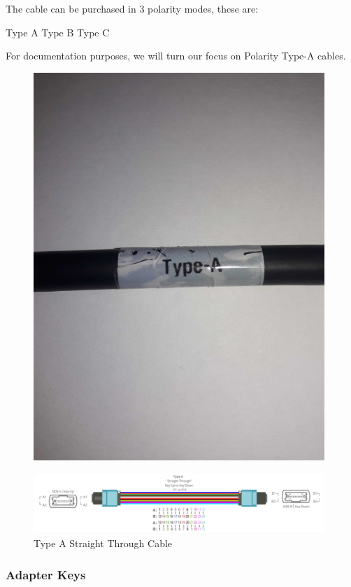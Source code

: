   The cable can be purchased in 3 polarity modes, these are:

      Type A
      Type B
      Type C

  For documentation purposes, we will turn our focus on Polarity Type-A cables.

\begin{figure}
  \includegraphics[width=11cm]{images/66.jpg}
  \centering
  \label{fig:jlsimon}
\end{figure}

\begin{figure}
  \includegraphics[width=11cm]{images/7.png}
  \centering
  \caption{Type A Straight Through Cable}
  \label{fig:jlsimon}
\end{figure}

\subsubsection{Adapter Keys}

